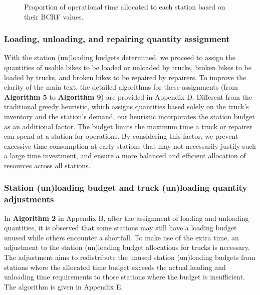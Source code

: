 \begin{figure}[htbp]
\centering
{}
\caption{Proportion of operational time allocated to each station based on their BCRF values.}
\label{ch4:fig:bcrf-time-allocation}
\end{figure}

\subsubsection{Loading, unloading, and repairing quantity assignment}\label{ch4:subsubsec:quantity-assignment}

With the station (un)loading budgets determined, we proceed to assign the quantities of usable bikes
to be loaded or unloaded by trucks, broken bikes to be loaded by trucks, and broken bikes to be
repaired by repairers. To improve the clarity of the main text, the detailed algorithms for these
assignments (from \textbf{Algorithm 5} to \textbf{Algorithm 9}) are provided in Appendix D.
Different from the traditional greedy heuristic, which assigns quantities based solely on the
truck's inventory and the station's demand, our heuristic incorporates the station budget as an
additional factor. The budget limits the maximum time a truck or repairer can spend at a station for
operations. By considering this factor, we prevent excessive time consumption at early stations that
may not necessarily justify such a large time investment, and ensure a more balanced and efficient
allocation of resources across all stations.

\subsubsection{Station (un)loading budget and truck (un)loading quantity adjustments}\label{ch4:subsubsec:budget-quantity-adjustments}

In \textbf{Algorithm 2} in Appendix B, after the assignment of loading and unloading quantities, it
is observed that some stations may still have a loading budget unused while others encounter a
shortfall. To make use of the extra time, an adjustment to the station (un)loading budget
allocations for trucks is necessary. The adjustment aims to redistribute the unused station
(un)loading budgets from stations where the allocated time budget exceeds the actual loading and
unloading time requirements to those stations where the budget is insufficient. The algorithm is
given in Appendix E.


